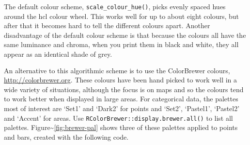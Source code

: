 The default colour scheme, \texttt{scale\_colour\_hue()}, picks evenly
spaced hues around the hcl colour wheel. This works well for up to about
eight colours, but after that it becomes hard to tell the different
colours apart. Another disadvantage of the default colour scheme is that
because the colours all have the same luminance and chroma, when you
print them in black and white, they all appear as an identical shade of
grey.  

An alternative to this algorithmic scheme is to use the ColorBrewer
colours, \url{http://colorbrewer.org}. These colours have been hand
picked to work well in a wide variety of situations, although the focus
is on maps and so the colours tend to work better when displayed in
large areas. For categorical data, the palettes most of interest are
`Set1' and `Dark2' for points and `Set2', `Pastel1', `Pastel2' and
`Accent' for areas. Use \texttt{RColorBrewer::display.brewer.all()} to
list all palettes. Figure\textasciitilde{}\ref{fig:brewer-pal} shows
three of these palettes applied to points and bars, created with the
following code.  

\begin{Shaded}
\begin{Highlighting}[]
\StringTok{ }  \NormalTok{, }
   
\StringTok{ }\NormalTok{(}  
   \NormalTok{)}

\StringTok{ }\NormalTok{(} \NormalTok{)}
\StringTok{ }\NormalTok{(} \NormalTok{)  }
\StringTok{ }\NormalTok{(} \NormalTok{)}
\StringTok{ }\NormalTok{(} \NormalTok{)}
\StringTok{ }\NormalTok{(} \NormalTok{)}
\StringTok{ }\NormalTok{(} \NormalTok{)}
\end{Highlighting}
\end{Shaded}


